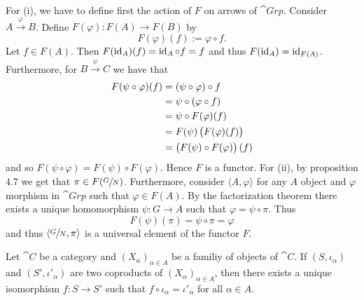 \begin{solution}
For (i), we have to define first the action of $F$ on arrows of $\cat{Grp}$. Consider $A \xrightarrow{\varphi}{} B$. Define $F(\varphi) : F(A) \to F(B)$ by 
\begin{equation*}
F(\varphi)(f) := \varphi \circ f.
\end{equation*}
Let $f \in F(A)$. Then $F(\operatorname{id}_A)(f) = \operatorname{id}_A \circ f = f$ and thus $F(\operatorname{id}_A) = \operatorname{id}_{F(A)}$. Furthermore, for $B \xrightarrow{\psi}{} C$ we have that
\begin{align*}
F(\psi \circ \varphi)(f) &= (\psi \circ \varphi) \circ f\\
&= \psi \circ (\varphi \circ f)\\
&= \psi \circ F(\varphi)(f)\\
&= F(\psi)\del[1]{F(\varphi)(f)}\\
&= \del[1]{F(\psi) \circ F(\varphi)}(f)
\end{align*}
\noindent and so $F(\psi \circ \varphi) = F(\psi) \circ F(\varphi)$. Hence $F$ is a functor. For (ii), by proposition 4.7 \cite[20]{grillet:abstract_algebra:2007} we get that $\pi \in F(\sfrac{G}{N})$. Furthermore, consider $\langle A, \varphi \rangle$ for any $A$ object and $\varphi$ morphism in $\cat{Grp}$ such that $\varphi \in F(A)$. By the factorization theorem \cite[23]{grillet:abstract_algebra:2007} there exists a unique homomorphism $\psi: G \to A$ such that $\varphi = \psi \circ \pi$. Thus 
\begin{equation*}
F(\psi)(\pi) = \psi \circ \pi = \varphi
\end{equation*}
\noindent and thus $\langle \sfrac{G}{N},\pi \rangle$ is a universal element of the functor $F$.
\end{solution}

\begin{exercise}
Let $\cat{C}$ be a category and $(X_\alpha)_{\alpha \in A}$ be a familiy of objects of $\cat{C}$. If $(S,\iota_\alpha)$ and $(S',\iota'_\alpha)$ are two coproducts of $(X_\alpha)_{\alpha \in A}$, then there exists a unique isomorphism $f : S \to S'$ such that $f \circ \iota_\alpha = \iota'_\alpha$ for all $\alpha \in A$.
\end{exercise}

